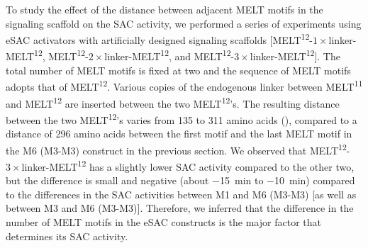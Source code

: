 To study the effect of the distance between adjacent MELT motifs in the signaling scaffold on the SAC activity, we performed a series of experiments using eSAC activators with artificially designed signaling scaffolds [MELT\textsuperscript{12}-$1\times$linker-MELT\textsuperscript{12}, MELT\textsuperscript{12}-$2\times$linker-MELT\textsuperscript{12}, and MELT\textsuperscript{12}-$3\times$linker-MELT\textsuperscript{12}]. The total number of MELT motifs is fixed at two and the sequence of MELT motifs adopts that of MELT\textsuperscript{12}. Various copies of the endogenous linker between MELT\textsuperscript{11} and MELT\textsuperscript{12} are inserted between the two MELT\textsuperscript{12}'s. The resulting distance between the two MELT\textsuperscript{12}'s varies from 135 to 311 amino acids (), compared to a distance of 296 amino acids between the first motif and the last MELT motif in the M6 (M3-M3) construct in the previous section. We observed that MELT\textsuperscript{12}-$3\times$linker-MELT\textsuperscript{12} has a slightly lower SAC activity compared to the other two, but the difference is small and negative (about \SI{-15}{min} to \SI{-10}{min}) compared to the differences in the SAC activities between M1 and M6 (M3-M3) [as well as between M3 and M6 (M3-M3)]. Therefore, we inferred that the difference in the number of MELT motifs in the eSAC constructs is the major factor that determines its SAC activity.

